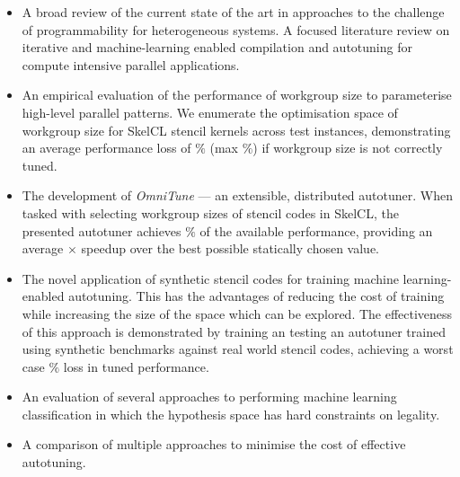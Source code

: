\begin{itemize}
\item A broad review of the current state of the art in approaches to
  the challenge of programmability for heterogeneous systems. A
  focused literature review on iterative and machine-learning enabled
  compilation and autotuning for compute intensive parallel
  applications.
\item An empirical evaluation of the performance of workgroup size to
  parameterise high-level parallel patterns. We enumerate the
  optimisation space of workgroup size for SkelCL stencil kernels
  across  test instances, demonstrating
  an average performance loss of
  $\%$ (max
  $\%$) if workgroup size is not
  correctly tuned.
\item The development of \emph{OmniTune} --- an extensible,
  distributed autotuner. When tasked with selecting workgroup sizes of
  stencil codes in SkelCL, the presented autotuner achieves
  $\%$ of the available
  performance, providing an average
  $\times$ speedup over the
  best possible statically chosen value.
\item The novel application of synthetic  stencil codes for training machine learning-enabled
  autotuning. This has the advantages of reducing the cost of training
  while increasing the size of the space which can be explored. The
  effectiveness of this approach is demonstrated by training an
  testing an autotuner trained using synthetic benchmarks against
   real world stencil codes, achieving a
  worst case
  $\%$
  loss in tuned performance.
\item An evaluation of several approaches to performing machine
  learning classification in which the hypothesis space has hard
  constraints on legality.
\item A comparison of multiple approaches to minimise the cost of
  effective autotuning. 
\end{itemize}


